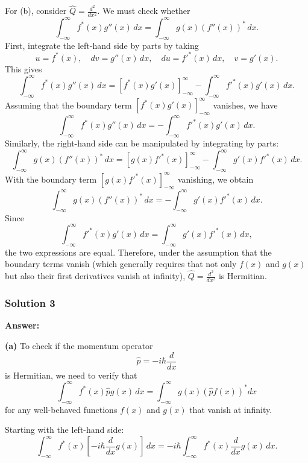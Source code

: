 \documentclass{article}
\begin{document}
For (b), consider $\hat{Q} = \frac{d^2}{dx^2}$. We must check whether
\[
\int_{-\infty}^{\infty} f^*(x) g''(x) \, dx = \int_{-\infty}^{\infty} g(x) \left(f''(x)\right)^* \, dx.
\]
First, integrate the left-hand side by parts by taking
\[
u=f^*(x), \quad dv=g''(x)\,dx, \quad du=f'^*(x)\,dx, \quad v=g'(x).
\]
This gives
\[
\int_{-\infty}^{\infty} f^*(x) g''(x) \, dx = \left[f^*(x)g'(x)\right]_{-\infty}^{\infty} - \int_{-\infty}^{\infty} f'^*(x) g'(x) \, dx.
\]
Assuming that the boundary term $\left[f^*(x)g'(x)\right]_{-\infty}^{\infty}$ vanishes, we have
\[
\int_{-\infty}^{\infty} f^*(x) g''(x) \, dx = - \int_{-\infty}^{\infty} f'^*(x) g'(x) \, dx.
\]
Similarly, the right-hand side can be manipulated by integrating by parts:
\[
\int_{-\infty}^{\infty} g(x)\left(f''(x)\right)^* \, dx = \left[g(x) f'^*(x)\right]_{-\infty}^{\infty} - \int_{-\infty}^{\infty} g'(x) f'^*(x) \, dx.
\]
With the boundary term $\left[g(x) f'^*(x)\right]_{-\infty}^{\infty}$ vanishing, we obtain
\[
\int_{-\infty}^{\infty} g(x)\left(f''(x)\right)^* \, dx = - \int_{-\infty}^{\infty} g'(x) f'^*(x) \, dx.
\]
Since 
\[
\int_{-\infty}^{\infty} f'^*(x) g'(x) \, dx = \int_{-\infty}^{\infty} g'(x) f'^*(x) \, dx,
\]
the two expressions are equal. Therefore, under the assumption that the boundary terms vanish (which generally requires that not only $f(x)$ and $g(x)$ but also their first derivatives vanish at infinity), $\hat{Q} = \frac{d^2}{dx^2}$ is Hermitian.

\subsubsection{Solution 3}
\textbf{Answer:}

\textbf{(a)} To check if the momentum operator 
\[
\hat{p} = -i\hbar\frac{d}{dx}
\]
is Hermitian, we need to verify that
\[
\int_{-\infty}^{\infty} f^*(x) \hat{p} g(x)\, dx = \int_{-\infty}^{\infty} g(x) \left(\hat{p} f(x)\right)^* dx
\]
for any well-behaved functions \(f(x)\) and \(g(x)\) that vanish at infinity.

Starting with the left-hand side:
\[
\int_{-\infty}^{\infty} f^*(x) \left[-i\hbar \frac{d}{dx}g(x)\right]\, dx = -i\hbar \int_{-\infty}^{\infty} f^*(x) \frac{d}{dx}g(x)\, dx.
\]
\end{document}
